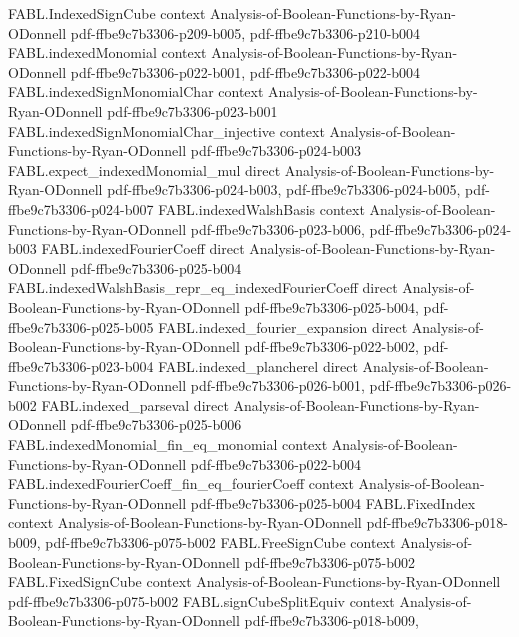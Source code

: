 \begin{theorem}
\proofstep
  {FABL.IndexedSignCube}
  {context}
  {Analysis-of-Boolean-Functions-by-Ryan-ODonnell}
  {pdf-ffbe9c7b3306-p209-b005,
    pdf-ffbe9c7b3306-p210-b004}
\proofstep
  {FABL.indexedMonomial}
  {context}
  {Analysis-of-Boolean-Functions-by-Ryan-ODonnell}
  {pdf-ffbe9c7b3306-p022-b001,
    pdf-ffbe9c7b3306-p022-b004}
\proofstep
  {FABL.indexedSignMonomialChar}
  {context}
  {Analysis-of-Boolean-Functions-by-Ryan-ODonnell}
  {pdf-ffbe9c7b3306-p023-b001}
\proofstep
  {FABL.indexedSignMonomialChar_injective}
  {context}
  {Analysis-of-Boolean-Functions-by-Ryan-ODonnell}
  {pdf-ffbe9c7b3306-p024-b003}
\proofstep
  {FABL.expect_indexedMonomial_mul}
  {direct}
  {Analysis-of-Boolean-Functions-by-Ryan-ODonnell}
  {pdf-ffbe9c7b3306-p024-b003,
    pdf-ffbe9c7b3306-p024-b005,
    pdf-ffbe9c7b3306-p024-b007}
\proofstep
  {FABL.indexedWalshBasis}
  {context}
  {Analysis-of-Boolean-Functions-by-Ryan-ODonnell}
  {pdf-ffbe9c7b3306-p023-b006,
    pdf-ffbe9c7b3306-p024-b003}
\proofstep
  {FABL.indexedFourierCoeff}
  {direct}
  {Analysis-of-Boolean-Functions-by-Ryan-ODonnell}
  {pdf-ffbe9c7b3306-p025-b004}
\proofstep
  {FABL.indexedWalshBasis_repr_eq_indexedFourierCoeff}
  {direct}
  {Analysis-of-Boolean-Functions-by-Ryan-ODonnell}
  {pdf-ffbe9c7b3306-p025-b004,
    pdf-ffbe9c7b3306-p025-b005}
\proofstep
  {FABL.indexed_fourier_expansion}
  {direct}
  {Analysis-of-Boolean-Functions-by-Ryan-ODonnell}
  {pdf-ffbe9c7b3306-p022-b002,
    pdf-ffbe9c7b3306-p023-b004}
\proofstep
  {FABL.indexed_plancherel}
  {direct}
  {Analysis-of-Boolean-Functions-by-Ryan-ODonnell}
  {pdf-ffbe9c7b3306-p026-b001,
    pdf-ffbe9c7b3306-p026-b002}
\proofstep
  {FABL.indexed_parseval}
  {direct}
  {Analysis-of-Boolean-Functions-by-Ryan-ODonnell}
  {pdf-ffbe9c7b3306-p025-b006}
\proofstep
  {FABL.indexedMonomial_fin_eq_monomial}
  {context}
  {Analysis-of-Boolean-Functions-by-Ryan-ODonnell}
  {pdf-ffbe9c7b3306-p022-b004}
\proofstep
  {FABL.indexedFourierCoeff_fin_eq_fourierCoeff}
  {context}
  {Analysis-of-Boolean-Functions-by-Ryan-ODonnell}
  {pdf-ffbe9c7b3306-p025-b004}
\proofstep
  {FABL.FixedIndex}
  {context}
  {Analysis-of-Boolean-Functions-by-Ryan-ODonnell}
  {pdf-ffbe9c7b3306-p018-b009,
    pdf-ffbe9c7b3306-p075-b002}
\proofstep
  {FABL.FreeSignCube}
  {context}
  {Analysis-of-Boolean-Functions-by-Ryan-ODonnell}
  {pdf-ffbe9c7b3306-p075-b002}
\proofstep
  {FABL.FixedSignCube}
  {context}
  {Analysis-of-Boolean-Functions-by-Ryan-ODonnell}
  {pdf-ffbe9c7b3306-p075-b002}
\proofstep
  {FABL.signCubeSplitEquiv}
  {context}
  {Analysis-of-Boolean-Functions-by-Ryan-ODonnell}
  {pdf-ffbe9c7b3306-p018-b009,
}
\end{theorem}
